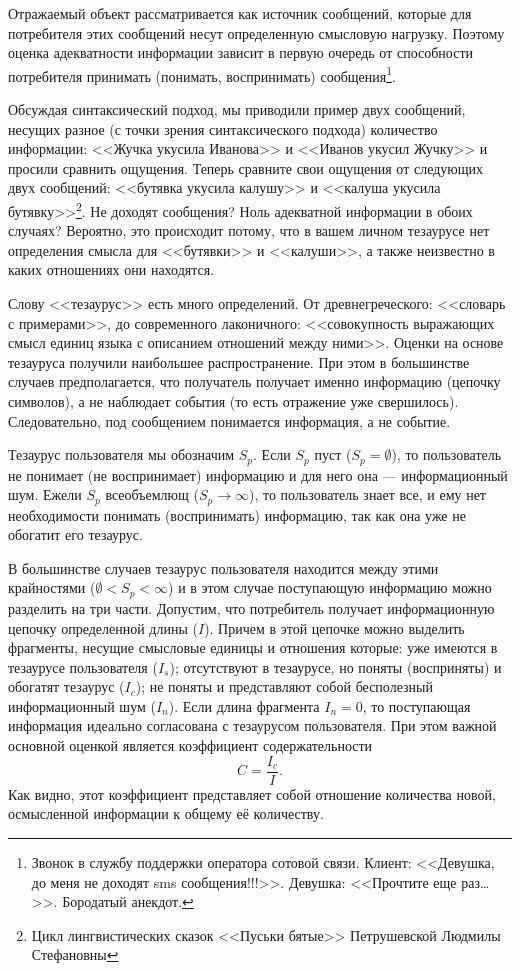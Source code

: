 Отражаемый объект рассматривается как источник сообщений, которые для потребителя этих сообщений несут определенную смысловую нагрузку. Поэтому оценка адекватности информации зависит в первую очередь от способности потребителя принимать (понимать, воспринимать) сообщения\footnote{Звонок в службу поддержки оператора сотовой связи. Клиент: <<Девушка, до меня не доходят sms сообщения!!!>>.  Девушка: <<Прочтите еще раз\ldots>>. Бородатый анекдот.}. 

Обсуждая синтаксический подход, мы приводили пример двух сообщений, несущих разное (с точки зрения синтаксического подхода) количество информации: <<Жучка укусила Иванова>> и <<Иванов укусил Жучку>> и просили сравнить ощущения. Теперь сравните свои ощущения от следующих двух сообщений: <<бутявка укусила калушу>> и <<калуша укусила бутявку>>\footnote{Цикл лингвистических сказок <<Пуськи бятые>> Петрушевской Людмилы Стефановны}. Не доходят сообщения? Ноль адекватной информации в обоих случаях? Вероятно, это происходит потому, что в вашем личном тезаурусе нет определения смысла для <<бутявки>> и <<калуши>>, а также неизвестно в каких отношениях они находятся.

Слову <<тезаурус>> есть много определений. От древнегреческого: <<словарь с примерами>>, до современного лаконичного: <<совокупность выражающих смысл единиц языка с описанием отношений между ними>>. Оценки на основе тезауруса получили наибольшее распространение. При этом в большинстве случаев предполагается, что получатель получает именно информацию (цепочку символов), а не наблюдает события (то есть отражение уже свершилось). Следовательно, под сообщением понимается информация, а не событие.

Тезаурус пользователя мы обозначим $S_p$. Если $S_p$ пуст ($S_p=\emptyset$), то пользователь не понимает (не воспринимает) информацию и для него она --- информационный шум. Ежели $S_p$ всеобъемлющ ($S_p\rightarrow\infty$), то пользователь знает все, и ему нет необходимости понимать (воспринимать) информацию, так как она уже не обогатит его тезаурус. 

В большинстве случаев тезаурус пользователя находится между этими крайностями ($\emptyset<S_p<\infty$) и в этом случае поступающую информацию можно разделить на три части. Допустим, что потребитель получает информационную цепочку определенной длины ($I$). Причем в этой цепочке можно выделить фрагменты, несущие смысловые единицы и отношения которые: уже имеются в тезаурусе пользователя ($I_s$); отсутствуют в тезаурусе, но поняты (восприняты) и обогатят тезаурус ($I_c$); не поняты и представляют собой бесполезный информационный шум ($I_n$). Если длина фрагмента $I_n=0$, то поступающая информация идеально согласована с тезаурусом пользователя. При этом важной основной оценкой является коэффициент содержательности
\[C=\frac{I_c}{I}.\]
Как видно, этот коэффициент представляет собой отношение количества новой, осмысленной информации к общему её количеству.

